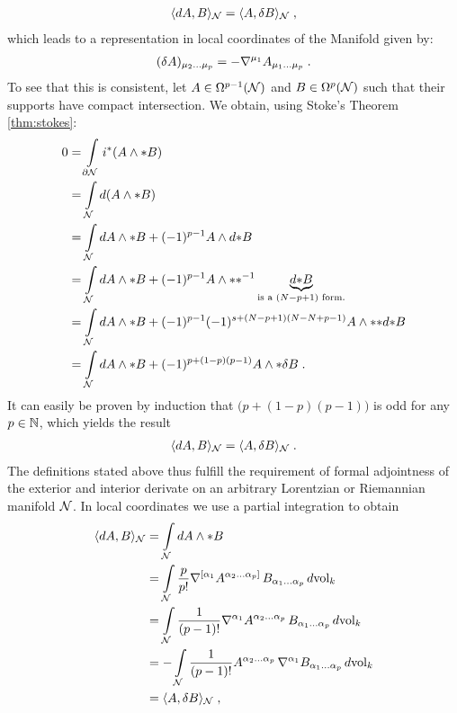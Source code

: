 \begin{align}
\langle dA , B \rangle_{\mathcal{N}} = \langle A , \delta B \rangle_{\mathcal{N}} \;,
\end{align}
which leads to a representation in local coordinates of the Manifold given by:
\begin{align}
(\delta A)_{\mu_2\dots\mu_p} = - \nabla^{\mu_1}A_{\mu_1\dots\mu_p} \;.
\end{align}
To see that this is consistent, let $A \in \Omega^{p-1}(\mathcal{N})$ and $B \in \Omega^{p}(\mathcal{N})$ such that their supports have compact intersection.
We obtain, using Stoke's Theorem \ref{thm:stokes}:
\begin{align}
0 &= \int \limits_{\partial \mathcal{N}} i^* (A \wedge *B) \notag\\
&= \int \limits_{\mathcal{N}} d(A \wedge *B)  \notag\\
&= \int \limits_{\mathcal{N}} dA \wedge *B + (-1)^{p-1} A \wedge d{*B} \notag\\
&= \int \limits_{\mathcal{N}} dA \wedge *B + (-1)^{p-1} A \wedge *{*^{-1}}\underbrace{d{*B}}_{\textrm{is a } (N-p+1) \textrm{ form.}} \notag\\
&= \int \limits_{\mathcal{N}} dA \wedge *B + (-1)^{p-1}(-1)^{s+(N-p+1)(N-N+p-1)} A \wedge *{*d{*B}} \notag\\
&= \int \limits_{\mathcal{N}} dA \wedge *B + (-1)^{p+(1-p)(p-1)} A \wedge *\delta B \;.
\end{align}
It can easily be proven by induction that $\big(p+(1-p)(p-1)\big)$ is odd for any $p \in \mathbb{N}$, which yields the result
\begin{align}
\langle dA , B \rangle_{\mathcal{N}} = \langle A , \delta B \rangle_{\mathcal{N}} \;.
\end{align}
The definitions stated above thus fulfill the requirement of formal adjointness of the exterior and interior derivate on an arbitrary Lorentzian or Riemannian manifold $\mathcal{N}$.
In local coordinates we use a partial integration to obtain
\begin{align}
\langle dA , B \rangle_{\mathcal{N}} &= \int \limits_{\mathcal{N}} dA \wedge * B \notag\\
&= \int \limits_{\mathcal{N}}  \frac{p}{p!} \nabla^{[\alpha_1}A^{\alpha_2\dots\alpha_p]}\,B_{\alpha_1 \dots \alpha_p} \, d\textrm{vol}_k \notag\\
&= \int \limits_{\mathcal{N}}  \frac{1}{(p-1)!} \nabla^{\alpha_1}A^{\alpha_2\dots\alpha_p}\,B_{\alpha_1 \dots \alpha_p} \, d\textrm{vol}_k \notag\\
&= - \int \limits_{\mathcal{N}}  \frac{1}{(p-1)!} A^{\alpha_2\dots\alpha_p}\, \nabla^{\alpha_1}B_{\alpha_1 \dots \alpha_p} \, d\textrm{vol}_k \notag\\
&= \langle A, \delta B \rangle_{\mathcal{N}} \;,
\end{align}
